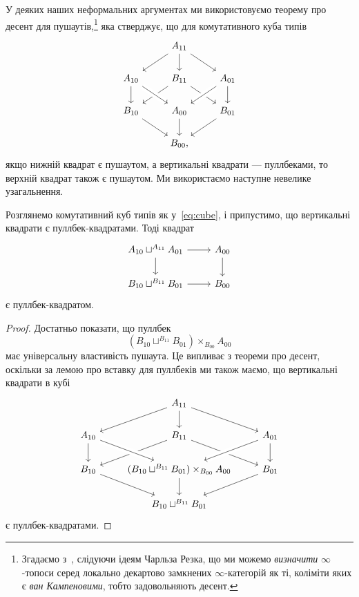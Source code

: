 \documentclass[12pt]{article}
\begin{document}
У деяких наших неформальних аргументах ми використовуємо теорему про десент для пушаутів,\footnote{Згадаємо з~\cite[\S6.1.3]{LurieHTT}, слідуючи ідеям Чарльза Резка, що ми можемо \emph{визначити} $\infty$-топоси серед локально декартово замкнених $\infty$-категорій як ті, коліміти яких є \emph{ван Кампеновими}, тобто задовольняють десент.} яка стверджує, що для комутативного куба типів
\begin{equation}\label{eq:cube}
\begin{tikzcd}
& A_{11} \arrow[dl] \arrow[dr] \arrow[d] \\
A_{10} \arrow[d] & B_{11} \arrow[dl] \arrow[dr] & A_{01} \arrow[dl,crossing over] \arrow[d] \\
B_{10} \arrow[dr] & A_{00} \arrow[d] \arrow[from=ul,crossing over] & B_{01} \arrow[dl] \\
& B_{00},
\end{tikzcd}
\end{equation}
якщо нижній квадрат є пушаутом, а вертикальні квадрати — пуллбеками, то верхній квадрат також є пушаутом. Ми використаємо наступне невелике узагальнення.

\begin{theorem}
Розглянемо комутативний куб типів як у~\eqref{eq:cube}, і припустимо, що вертикальні квадрати є пуллбек-квадратами. Тоді квадрат
\begin{equation*}
\begin{tikzcd}
A_{10} \sqcup^{A_{11}} A_{01} \arrow[r] \arrow[d] & A_{00} \arrow[d] \\
B_{10} \sqcup^{B_{11}} B_{01} \arrow[r] & B_{00}
\end{tikzcd}
\end{equation*}
є пуллбек-квадратом.
\end{theorem}

\begin{proof}
Достатньо показати, що пуллбек
\begin{equation*}
(B_{10} \sqcup^{B_{11}} B_{01}) \times_{B_{00}} A_{00}
\end{equation*}
має універсальну властивість пушаута. Це випливає з теореми про десент, оскільки за лемою про вставку для пуллбеків ми також маємо, що вертикальні квадрати в кубі
\begin{equation*}
\begin{tikzcd}
& A_{11} \arrow[dl] \arrow[d] \arrow[dr] \\
A_{10} \arrow[d] & B_{11} \arrow[dl] \arrow[dr] & A_{01} \arrow[dl,crossing over] \arrow[d] \\
B_{10} \arrow[dr] & (B_{10} \sqcup^{B_{11}} B_{01}) \times_{B_{00}} A_{00} \arrow[d] \arrow[from=ul,crossing over] & B_{01} \arrow[dl] \\
& B_{10} \sqcup^{B_{11}} B_{01}
\end{tikzcd}
\end{equation*}
є пуллбек-квадратами.
\end{proof}
\end{document}
